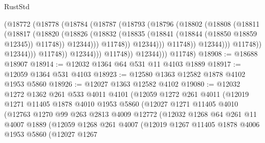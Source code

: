 \begin{lexlean}{RustStd}
\begin{coremodule}
{\begin{coremodule}
{{{{{{{{{{{{{{{{{{{{{{{{{{{{{                                    (@18772
                                      (@18778
                                        (@18784
                                          (@18787
                                            (@18793
                                              (@18796
                                                (@18802
                                                  (@18808
                                                    (@18811
                                                      (@18817
                                                        (@18820
                                                          (@18826
                                                            (@18832
                                                              (@18835
                                                                (@18841
                                                                  (@18844 (@18850 @18859 @12345))
                                                                  @11748))
                                                              @12344)))
                                                        @11748))
                                                    @12344)))
                                              @11748))
                                          @12344)))
                                    @11748))
                                @12344)))
                          @11748))
                      @12344)))
                @11748))
            @12344)))
      @11748)
@18908 := @18688 @18907
@18914 := @12032 @1364 @64 @531 @11 @4103 @1889
@18917 := @12059 @1364 @531 @4103
@18923 := @12580 @1363 @12582 @1878 @4102 @1953 @5860
@18926 := @12027 @1363 @12582 @4102
@19080 := @12032
    @1272
    @1362
    @261
    @533
    @4011
    @4101
    (@12059
      @1272
      @261
      @4011
      (@12019
        @1271
        @11405
        @1878
        @4010
        @1953
        @5860
        (@12027
          @1271
          @11405
          @4010
          (@12763
            @1270
            @99
            @263
            @2813
            @4009
            @12772
            (@12032
              @1268
              @64
              @261
              @11
              @4007
              @1889
              (@12059
                @1268
                @261
                @4007
                (@12019
                  @1267
                  @11405
                  @1878
                  @4006
                  @1953
                  @5860
                  (@12027
                    @1267
}}}}}}}}}}}}}}}}}}}}}}}}}}}}}
\end{coremodule}}
\end{coremodule}
\end{lexlean}
